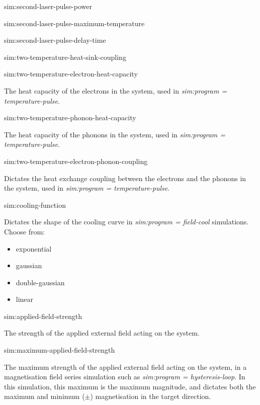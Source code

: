 {\zicf sim:second-laser-pulse-power}

{\zicf sim:second-laser-pulse-maximum-temperature}

{\zicf sim:second-laser-pulse-delay-time}

{\zicf sim:two-temperature-heat-sink-coupling}

{\zicf sim:two-temperature-electron-heat-capacity} The heat capacity of the electrons in the system, used in \textit{sim:program = temperature-pulse}.

{\zicf sim:two-temperature-phonon-heat-capacity} The heat capacity of the phonons in the system, used in \textit{sim:program = temperature-pulse}.

{\zicf sim:two-temperature-electron-phonon-coupling}
Dictates the heat exchange coupling between the electrons and the phonons in the system, used in \newline\textit{sim:program = temperature-pulse}.

{\zicf sim:cooling-function} Dictates the shape of the cooling curve in \textit{sim:program = field-cool} simulations. Choose from:

\begin{itemize}
    \item[] exponential
    \item[] gaussian
    \item[] double-gaussian
    \item[] linear
\end{itemize}

{\zicf sim:applied-field-strength} The strength of the applied external field acting on the system.

{\zicf  sim:maximum-applied-field-strength}
The maximum strength of the applied external field acting on the system, in a magnetisation field series simulation such as \textit{sim:program = hysteresis-loop}. In this simulation, this maximum is the maximum magnitude, and dictates both the maximum and minimum ($\pm$) magnetisation in the target direction.


